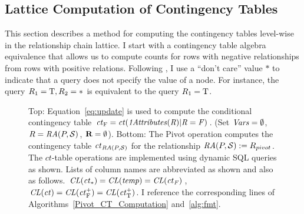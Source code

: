\documentclass{sfuthesis}
\newcommand{\ct}{\mathit{ct}}
\begin{document}
\subsection{Lattice Computation of Contingency Tables} \label{sec:mobius}
This section describes a method for computing the contingency tables level-wise in the relationship chain lattice. I  start with a contingency table algebra equivalence that allows us to compute counts for rows with negative relationships from rows with positive relations. Following \cite{Moore1998}, I  use a ``don't care'' value $*$ to indicate that a query does not specify the value of a node. For instance, the query $R_{1} = \mathrm{T}, R_{2} = *$ is equivalent to the query $R_{1} = \mathrm{T}$. 
\begin{figure}[!h]
\begin{center}
\caption{Top: Equation~\eqref{eq:update} is used to compute the conditional contingency table $\ct_{\false} = \ct(\eatts(R)|R = F)$. (Set $\it{Vars} = \emptyset$, $R = \mathit{RA}(P,\mathcal{S})$, $\mathbf{R} = \emptyset$). Bottom: 
The Pivot operation computes the contingency table $\ct_{\ra(\P,\S)}$ for the relationship $\mathit{RA}(P,\mathcal{S}) := R_{pivot}$. The $\ct$-table operations are implemented using dynamic SQL queries as shown. Lists of column names are abbreviated as shown and also as follows.
$\ColumnList({\ct_{*}}) = \ColumnList({temp})=\ColumnList({\ct_{F}})$, 
$\ColumnList({\ct}) =  \ColumnList(\ct_{\false}^{+})  = \ColumnList(\ct_{\true}^{+}) $. I  reference the corresponding lines of Algorithms~\ref{Pivot_CT_Computation} and~\ref{alg:fmt}.
\label{fig:flow}}
\end{center}
\end{figure}
\end{document}
